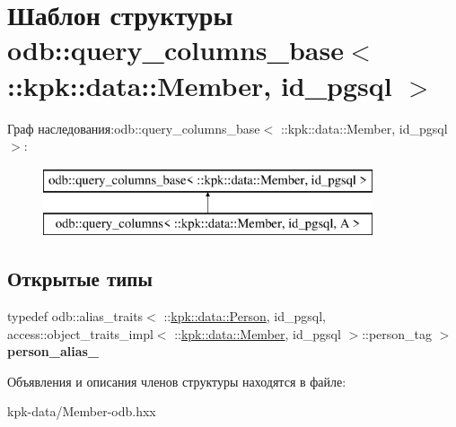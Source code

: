 \hypertarget{structodb_1_1query__columns__base_3_01_1_1kpk_1_1data_1_1_member_00_01id__pgsql_01_4}{}\section{Шаблон структуры odb\+:\+:query\+\_\+columns\+\_\+base$<$ \+:\+:kpk\+:\+:data\+:\+:Member, id\+\_\+pgsql $>$}
\label{structodb_1_1query__columns__base_3_01_1_1kpk_1_1data_1_1_member_00_01id__pgsql_01_4}
Граф наследования\+:odb\+:\+:query\+\_\+columns\+\_\+base$<$ \+:\+:kpk\+:\+:data\+:\+:Member, id\+\_\+pgsql $>$\+:\begin{figure}[H]
\begin{center}
\leavevmode
\includegraphics[height=2.000000cm]{structodb_1_1query__columns__base_3_01_1_1kpk_1_1data_1_1_member_00_01id__pgsql_01_4}
\end{center}
\end{figure}
\subsection*{Открытые типы}
\begin{DoxyCompactItemize}
\item 
typedef odb\+::alias\+\_\+traits$<$ \+::\hyperlink{classkpk_1_1data_1_1_person}{kpk\+::data\+::\+Person}, id\+\_\+pgsql, access\+::object\+\_\+traits\+\_\+impl$<$ \+::\hyperlink{classkpk_1_1data_1_1_member}{kpk\+::data\+::\+Member}, id\+\_\+pgsql $>$\+::person\+\_\+tag $>$ {\bfseries person\+\_\+alias\+\_\+}\hypertarget{structodb_1_1query__columns__base_3_01_1_1kpk_1_1data_1_1_member_00_01id__pgsql_01_4_ab9a6e9e499ee81d82a47dd4858bd2724}{}\label{structodb_1_1query__columns__base_3_01_1_1kpk_1_1data_1_1_member_00_01id__pgsql_01_4_ab9a6e9e499ee81d82a47dd4858bd2724}

\end{DoxyCompactItemize}


Объявления и описания членов структуры находятся в файле\+:\begin{DoxyCompactItemize}
\item 
kpk-\/data/Member-\/odb.\+hxx\end{DoxyCompactItemize}
